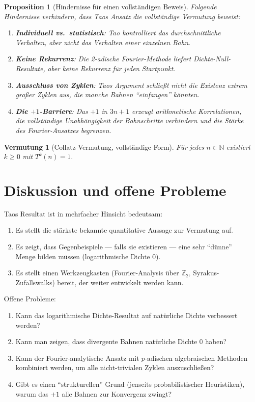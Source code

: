 \documentclass[12pt,a4paper]{article}
\newtheorem{proposition}[theorem]{Proposition}
\newtheorem{conjecture}[theorem]{Vermutung}
\begin{document}
\begin{proposition}[Hindernisse für einen vollständigen Beweis]\label{prop:hindernisse}
Folgende Hindernisse verhindern, dass Taos Ansatz die vollständige Vermutung beweist:
\begin{enumerate}
  \item \textbf{Individuell vs.\ statistisch}: Tao kontrolliert das durchschnittliche
        Verhalten, aber nicht das Verhalten einer einzelnen Bahn.
  \item \textbf{Keine Rekurrenz}: Die 2-adische Fourier-Methode liefert Dichte-Null-Resultate,
        aber keine Rekurrenz für jeden Startpunkt.
  \item \textbf{Ausschluss von Zyklen}: Taos Argument schließt nicht die Existenz
        extrem großer Zyklen aus, die manche Bahnen ``einfangen'' könnten.
  \item \textbf{Die $+1$-Barriere}: Das $+1$ in $3n+1$ erzeugt arithmetische Korrelationen,
        die vollständige Unabhängigkeit der Bahnschritte verhindern und die Stärke des
        Fourier-Ansatzes begrenzen.
\end{enumerate}
\end{proposition}

\begin{conjecture}[Collatz-Vermutung, vollständige Form]\label{conj:vollstaendig}
Für jedes $n \in \mathbb{N}$ existiert $k \geq 0$ mit $T^k(n) = 1$.
\end{conjecture}

\section{Diskussion und offene Probleme}

Taos Resultat ist in mehrfacher Hinsicht bedeutsam:
\begin{enumerate}
  \item Es stellt die stärkste bekannte quantitative Aussage zur Vermutung auf.
  \item Es zeigt, dass Gegenbeispiele --- falls sie existieren --- eine sehr ``dünne''
        Menge bilden müssen (logarithmische Dichte 0).
  \item Es stellt einen Werkzeugkasten (Fourier-Analysis über $\mathbb{Z}_2$,
        Syrakus-Zufallswalks) bereit, der weiter entwickelt werden kann.
\end{enumerate}

Offene Probleme:
\begin{enumerate}
  \item Kann das logarithmische Dichte-Resultat auf natürliche Dichte verbessert werden?
  \item Kann man zeigen, dass divergente Bahnen natürliche Dichte 0 haben?
  \item Kann der Fourier-analytische Ansatz mit $p$-adischen algebraischen Methoden
        kombiniert werden, um alle nicht-trivialen Zyklen auszuschließen?
  \item Gibt es einen ``strukturellen'' Grund (jenseits probabilistischer Heuristiken),
        warum das $+1$ alle Bahnen zur Konvergenz zwingt?
\end{enumerate}
\end{document}
